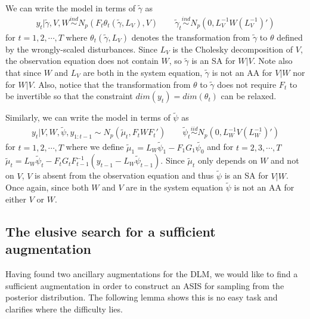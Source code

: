 \documentclass[12pt]{article}
\begin{document}
We can write the model in terms of $\tilde{\gamma}$ as
\begin{align*}
  y_t|\tilde{\gamma},V,W \stackrel{ind}{\sim} N_p\left(F_t\theta_t(\tilde{\gamma},L_V), V\right) \qquad  
  \tilde{\gamma}_t \stackrel{ind}{\sim}N_p(0,L_V^{-1}W(L_V^{-1})')
\end{align*}
for $t=1,2,\cdots,T$ where $\theta_t(\tilde{\gamma},L_V)$ denotes the transformation from $\tilde{\gamma}$ to $\theta$ defined by the wrongly-scaled disturbances. Since $L_V$ is the Cholesky decomposition of $V$, the observation equation does not contain $W$, so $\tilde{\gamma}$ is an SA for $W|V$. Note also that since $W$ and $L_V$ are both in the system equation, $\tilde{\gamma}$ is not an AA for $V|W$ nor for $W|V$. Also, notice that the transformation from $\theta$ to $\tilde{\gamma}$ does not require $F_t$ to be invertible so that the constraint $dim(y_t)=dim(\theta_t)$ can be relaxed.

Similarly, we can write the model in terms of $\tilde{\psi}$ as
\begin{align*}
  y_t|V,W,\tilde{\psi},y_{1:t-1} \sim N_p(\tilde{\mu}_t, F_tWF_t') \qquad 
  \tilde{\psi}_t  \stackrel{iid}{\sim} N_p(0,L_W^{-1}V(L_W^{-1})')
\end{align*}
for $t=1,2,\cdots,T$ where we define $\tilde{\mu}_1 = L_W\tilde{\psi}_1 - F_1G_1\tilde{\psi_0}$ and for $t=2,3,\cdots,T$ $\tilde{\mu}_t =L_W\tilde{\psi}_t - F_tG_tF_{t-1}^{-1}(y_{t-1} - L_{W}\tilde{\psi}_{t-1})$. Since $\tilde{\mu}_t$ only depends on $W$ and not on $V$, $V$ is absent from the observation equation and thus $\tilde{\psi}$ is an SA for $V|W$. Once again, since both $W$ and $V$ are in the system equation $\tilde{\psi}$ is not an AA for either $V$ or $W$.

\subsection{The elusive search for a sufficient augmentation}

Having found two ancillary augmentations for the DLM, we would like to find a sufficient augmentation in order to construct an ASIS for sampling from the posterior distribution. The following lemma shows this is no easy task and clarifies where the difficulty lies.
\end{document}

